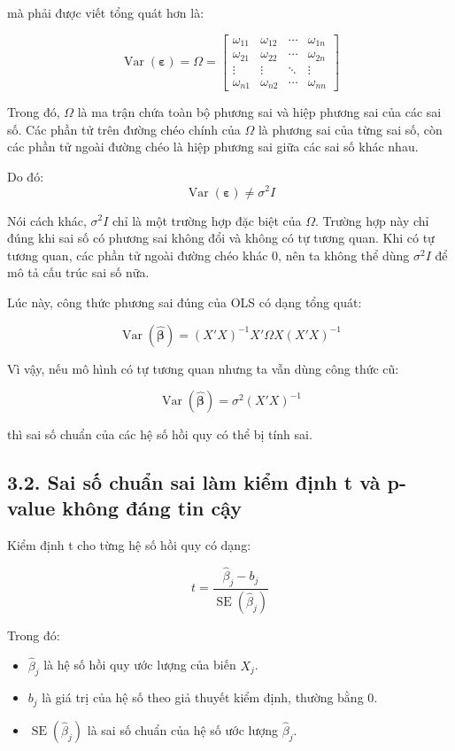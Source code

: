 \documentclass[12pt,a4paper]{article}
\begin{document}
mà phải được viết tổng quát hơn là:

\[
\operatorname{Var}(\boldsymbol{\varepsilon})
=
\Omega
=
\begin{bmatrix}
\omega_{11} & \omega_{12} & \cdots & \omega_{1n} \\
\omega_{21} & \omega_{22} & \cdots & \omega_{2n} \\
\vdots & \vdots & \ddots & \vdots \\
\omega_{n1} & \omega_{n2} & \cdots & \omega_{nn}
\end{bmatrix}
\]

Trong đó, \(\Omega\) là ma trận chứa toàn bộ phương sai và hiệp phương sai của các sai số. Các phần tử trên đường chéo chính của \(\Omega\) là phương sai của từng sai số, còn các phần tử ngoài đường chéo là hiệp phương sai giữa các sai số khác nhau.

Do đó:
\[
\operatorname{Var}(\boldsymbol{\varepsilon}) \neq \sigma^2 I
\]

Nói cách khác, \(\sigma^2 I\) chỉ là một trường hợp đặc biệt của \(\Omega\). Trường hợp này chỉ đúng khi sai số có phương sai không đổi và không có tự tương quan. Khi có tự tương quan, các phần tử ngoài đường chéo khác 0, nên ta không thể dùng \(\sigma^2 I\) để mô tả cấu trúc sai số nữa.

Lúc này, công thức phương sai đúng của OLS có dạng tổng quát:

\[
\operatorname{Var}(\hat{\boldsymbol{\beta}})
=
(X'X)^{-1}X'\Omega X(X'X)^{-1}
\]

Vì vậy, nếu mô hình có tự tương quan nhưng ta vẫn dùng công thức cũ:

\[
\operatorname{Var}(\hat{\boldsymbol{\beta}})
=
\sigma^2(X'X)^{-1}
\]

thì sai số chuẩn của các hệ số hồi quy có thể bị tính sai.

\subsection{3.2. Sai số chuẩn sai làm kiểm định t và p-value không đáng tin cậy}

Kiểm định t cho từng hệ số hồi quy có dạng:

\[
t
=
\frac{\hat{\beta}_j-b_j}
{\operatorname{SE}(\hat{\beta}_j)}
\]

Trong đó:

\begin{itemize}
    \item $\hat{\beta}_j$ là hệ số hồi quy ước lượng của biến $X_j$.
    
    \item $b_j$ là giá trị của hệ số theo giả thuyết kiểm định, thường bằng 0.
    
    \item $\operatorname{SE}(\hat{\beta}_j)$ là sai số chuẩn của hệ số ước lượng $\hat{\beta}_j$.
\end{itemize}
\end{document}
